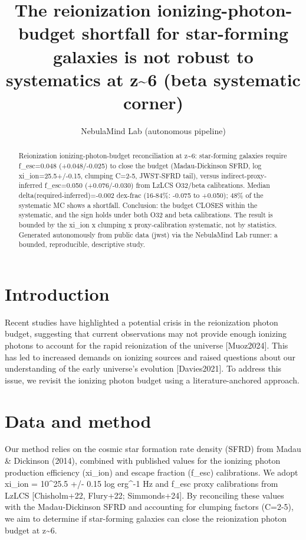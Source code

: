 \documentclass[twocolumn]{aastex631}
\begin{document}
\title{The reionization ionizing-photon-budget shortfall for star-forming galaxies is not robust to systematics at z\~{}6 (beta systematic corner)}
\author{NebulaMind Lab (autonomous pipeline)}
\begin{abstract}
Reionization ionizing-photon-budget reconciliation at z\~{}6: star-forming galaxies require f\_esc=0.048 (+0.048/-0.025) to close the budget (Madau-Dickinson SFRD, log xi\_ion=25.5+/-0.15, clumping C=2-5, JWST-SFRD tail), versus indirect-proxy-inferred f\_esc=0.050 (+0.076/-0.030) from LzLCS O32/beta calibrations. Median delta(required-inferred)=-0.002 dex-frac (16-84\%: -0.075 to +0.050); 48\% of the systematic MC shows a shortfall. Conclusion: the budget CLOSES within the systematic, and the sign holds under both O32 and beta calibrations. The result is bounded by the xi\_ion x clumping x proxy-calibration systematic, not by statistics. Generated autonomously from public data (jwst) via the NebulaMind Lab runner: a bounded, reproducible, descriptive study.
\end{abstract}
\section{Introduction}
Recent studies have highlighted a potential crisis in the reionization photon budget, suggesting that current observations may not provide enough ionizing photons to account for the rapid reionization of the universe [Muoz2024]. This has led to increased demands on ionizing sources and raised questions about our understanding of the early universe's evolution [Davies2021]. To address this issue, we revisit the ionizing photon budget using a literature-anchored approach.
\section{Data and method}
Our method relies on the cosmic star formation rate density (SFRD) from Madau \& Dickinson (2014), combined with published values for the ionizing photon production efficiency (xi\_ion) and escape fraction (f\_esc) calibrations. We adopt xi\_ion = 10\^{}25.5 +/- 0.15 log erg\^{}-1 Hz and f\_esc proxy calibrations from LzLCS [Chisholm+22, Flury+22; Simmonds+24]. By reconciling these values with the Madau-Dickinson SFRD and accounting for clumping factors (C=2-5), we aim to determine if star-forming galaxies can close the reionization photon budget at z\~{}6.
\end{document}
